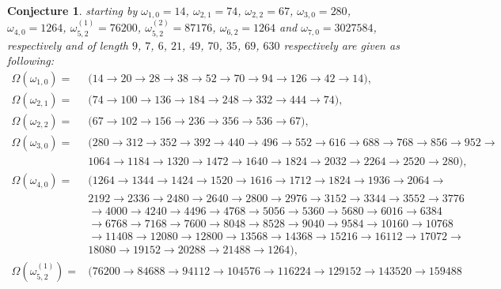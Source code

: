\documentclass[11pt,a4paper]{article}
\newtheorem{conjecture}{Conjecture}[section]
\begin{document}
\begin{conjecture}
starting by $\omega_{1,0}=14$, $\omega_{2,1}=74$,  $\omega_{2,2}=67$,  $\omega_{3,0}=280$, $\omega_{4,0}=1264$,
$\omega^{(1)}_{5,2}=76200$, $\omega^{(2)}_{5,2}=87176$, $\omega_{6,2}=1264$ and $\omega_{7,0}=3027584$, respectively and of length
$9$, $7$, $6$, $21$,  $49$, $70$, $35$, $69$, $630$  respectively are given as following:
$$\begin{array}{ll}
	\Omega(\omega_{1,0})=&
	\bigl(14\rightarrow 20\rightarrow  28\rightarrow 38\rightarrow 52\rightarrow 70\rightarrow  94 \rightarrow 126\rightarrow 42\rightarrow 14\bigr),\\
	\Omega(\omega_{2,1})=&	\bigl(74\rightarrow 100\rightarrow  136\rightarrow 184\rightarrow 248\rightarrow 332\rightarrow  444 \rightarrow 74 \bigr),\\
	\Omega(\omega_{2,2})=&
	\bigl(67\rightarrow102\rightarrow156\rightarrow236\rightarrow356\rightarrow536\rightarrow67\bigr),\\
	\Omega(\omega_{3,0})=&
	\bigl(280\rightarrow 312\rightarrow 352\rightarrow 392\rightarrow 440\rightarrow 496\rightarrow 552\rightarrow 616\rightarrow 688\rightarrow
	768\rightarrow856\rightarrow952\rightarrow\\
	& 1064\rightarrow 1184\rightarrow 1320\rightarrow 1472\rightarrow 1640\rightarrow
	1824\rightarrow 2032\rightarrow 2264 \rightarrow 2520 \rightarrow280),\\
	\Omega(\omega_{4,0})=&\bigl(
	1264\rightarrow 1344\rightarrow 1424\rightarrow 1520\rightarrow 1616\rightarrow 1712\rightarrow 1824\rightarrow 
	1936\rightarrow 2064\rightarrow\\
	&2192\rightarrow 2336\rightarrow  2480\rightarrow 2640\rightarrow 2800\rightarrow
	2976 \rightarrow 3152\rightarrow3344\rightarrow 3552\rightarrow 3776\\
	&\rightarrow 4000\rightarrow4240\rightarrow 
	4496\rightarrow
	4768\rightarrow 5056\rightarrow 5360\rightarrow 5680\rightarrow 6016\rightarrow 6384\\
	&\rightarrow6768\rightarrow 7168 \rightarrow 7600\rightarrow 8048\rightarrow 8528\rightarrow
	9040\rightarrow 9584\rightarrow 
	10160\rightarrow 10768	\\
	& \rightarrow 11408\rightarrow 12080\rightarrow 12800\rightarrow 13568\rightarrow 
	14368\rightarrow 15216\rightarrow 16112\rightarrow 17072\rightarrow	\\
	&  18080\rightarrow 19152\rightarrow
	20288\rightarrow 21488\rightarrow 1264\bigr),\\
	\Omega(\omega^{(1)}_{5,2})=&
	\bigl(76200\rightarrow84688\rightarrow94112\rightarrow104576\rightarrow116224\rightarrow129152\rightarrow143520\rightarrow159488\\

\end{array}$$
\end{conjecture}
\end{document}
